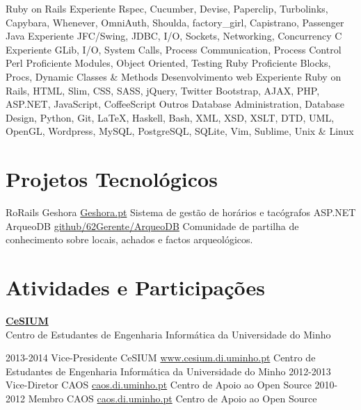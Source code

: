\documentclass[]{friggeri-cv}
\begin{document}
\begin{entrylist}
  \entry
    {}
    {Ruby on Rails}
    {Experiente}
    {Rspec, Cucumber, Devise, Paperclip, Turbolinks, Capybara, Whenever, OmniAuth, Shoulda, factory\_girl, Capistrano, Passenger}
  \entry
    {}
    {Java}
    {Experiente}
    {JFC/Swing, JDBC, I/O, Sockets, Networking, Concurrency}
  \entry
    {}
    {C}
    {Experiente}
    {GLib, I/O, System Calls, Process Communication, Process Control}
  \entry
    {}
    {Perl}
    {Proficiente}
    {Modules, Object Oriented, Testing}
  \entry
    {}
    {Ruby}
    {Proficiente}
    {Blocks, Procs, Dynamic Classes \& Methods}
  \entry
    {}
    {Desenvolvimento web}
    {Experiente}
    {Ruby on Rails, HTML, Slim, CSS, SASS, jQuery, Twitter Bootstrap, AJAX, PHP, ASP.NET, JavaScript, CoffeeScript}
  \entry
    {}
    {Outros}
    {}
    {Database Administration, Database Design, Python, Git, \LaTeX, Haskell, Bash, XML, XSD, XSLT, DTD, UML, OpenGL, Wordpress, MySQL, PostgreSQL, SQLite, Vim, Sublime, Unix \& Linux}
\end{entrylist}

\section{Projetos Tecnológicos}

\begin{entrylist}
  \entry
    {RoRails}
    {Geshora}
    {\href{http://geshora.pt}{Geshora.pt}} 
    {Sistema de gestão de horários e tacógrafos}
  \entry
    {ASP.NET}
    {ArqueoDB}
    {\href{https://github.com/62Gerente/ArqueoDB}{github/62Gerente/ArqueoDB}} 
    {Comunidade de partilha de conhecimento sobre locais, achados e factos arqueológicos.}
\end{entrylist}

\section{Atividades e Participações}

\textbf{\Large \href{http://www.cesium.di.uminho.pt/}{CeSIUM}} 
\\Centro de Estudantes de Engenharia Informática da Universidade do Minho

\begin{entrylist}
  \entry
    {2013-2014}
    {Vice-Presidente CeSIUM}
    {\href{http:www.cesium.di.uminho.pt}{www.cesium.di.uminho.pt}} 
    {Centro de Estudantes de Engenharia Informática da Universidade do Minho}
  \entry
    {2012-2013}
    {Vice-Diretor CAOS}
    {\href{http://caos.di.uminho.pt/}{caos.di.uminho.pt}} 
    {Centro de Apoio ao Open Source}
  \entry
    {2010-2012}
    {Membro CAOS}
    {\href{http://caos.di.uminho.pt/}{caos.di.uminho.pt}} 
    {Centro de Apoio ao Open Source}
\end{entrylist}
\end{document}
